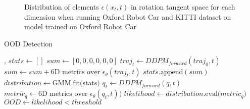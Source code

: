 \begin{figure}[t]
    \centering
    \caption{Distribution of elements $\epsilon(x_t, t)$ in rotation tangent space for each dimension when running Oxford Robot Car and KITTI dataset on model trained on Oxford Robot Car}
    \label{fig:rot_3d}
\end{figure}

\begin{algorithm}[t]
\caption{OOD Detection}
\label{algo:OOD}
\begin{algorithmic}[1]
\Require {}, 
\State $stats \gets []$
\State $sum \gets [0,0,0,0,0,0]$
    \State $traj_t \gets DDPM_{forward}(traj_0, t)$
    \State $sum \gets sum + \text{6D metrics over }\epsilon_\theta(traj_t, t)$
\EndFor
\State $stats.\text{append}(sum)$
\EndFor
\State $distribution \gets \text{GMM.fit(stats)}$
\State $q_t \gets DDPM_{forward}(q, t)$
\State $metric_q \gets \text{6D metrics over }\epsilon_\theta(q_t, t))$
\State $likelihood \gets distribution\text{.eval(}metric_q\text{)}$
\State $OOD \gets likelihood < threshold$
\end{algorithmic}
\end{algorithm}